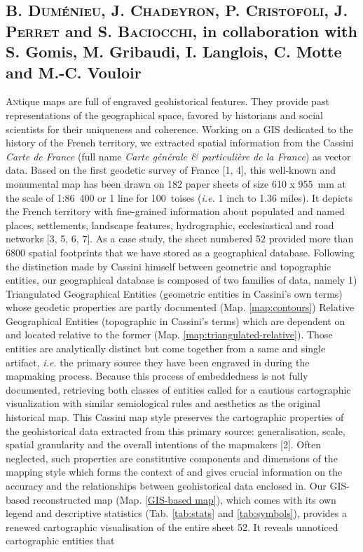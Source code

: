 \documentclass[portrait,a0]{sciposter}
\begin{document}
\vspace{1cm}
\begin{minipage}[b]{\textwidth}
  \setlength{\parindent}{-0em}
  \begin{multicols}{3}
    \section*{\normalfont B. \textsc{Duménieu}, J. \textsc{Chadeyron}, P. \textsc{Cristofoli}, J. \textsc{Perret} and S. \textsc{Baciocchi}, in collaboration with S. Gomis, M. Gribaudi, I. Langlois, C. Motte and M.-C. Vouloir}
    \lettrine{A}ntique maps are full of engraved geohistorical features. They provide past representations of the geographical space, favored by historians and social scientists for their uniqueness and coherence. Working on a GIS dedicated to the history of the French territory, we extracted spatial information from the Cassini \textit{Carte de France} (full name \textit{Carte générale \textsc{\textit{\&}} particulière de la France}) as vector data. Based on the first geodetic survey of France [1, 4], this well-known and monumental map has been drawn on 182 paper sheets of size 610 x 955~mm at the scale of 1:86~400 or 1 line for 100~toises (\textit{i.e.} 1 inch to 1.36 miles). It depicts the French territory with fine-grained information about populated and named places, settlements, landscape features, hydrographic, ecclesiastical and road networks [3, 5, 6, 7]. As a case study, the sheet numbered 52 provided more than \num{6800} spatial footprints that we have stored as a geographical database. Following the distinction made by Cassini himself between \og geometric \fg and \og topographic \fg entities, our geographical database is composed of two families of data, namely 1) Triangulated Geographical Entities (\og geometric \fg entities in Cassini’s own terms) whose geodetic properties are partly documented (Map. \ref{map:contours}) Relative Geographical Entities (\og topographic \fg in Cassini’s terms) which are dependent on and located relative to the former (Map. \ref{map:triangulated-relative}). Those entities are analytically distinct but come together from a same and single artifact, \emph{i.e.} the primary source they have been engraved in during the mapmaking process. Because this process of embeddedness is not fully documented, retrieving both classes of entities called for a cautious cartographic visualization with similar semiological rules and aesthetics as the original historical map. This \og Cassini map style \fg preserves the cartographic properties of the geohistorical data extracted from this primary source: generalisation, scale, spatial granularity and the overall intentions of the mapmakers [2]. Often neglected, such properties are constitutive components and dimensions of the mapping style which forms the context of and gives crucial information on the accuracy and the relationships between geohistorical data enclosed in. Our GIS-based reconstructed map (Map. \ref{GIS-based map}),  which comes with its own legend and descriptive statistics (Tab. \ref{tab:stats} and \ref{tab:symbols}), provides a renewed cartographic visualisation of the entire sheet 52. It reveals unnoticed cartographic entities that 
\end{multicols}
\end{minipage}
\end{document}

